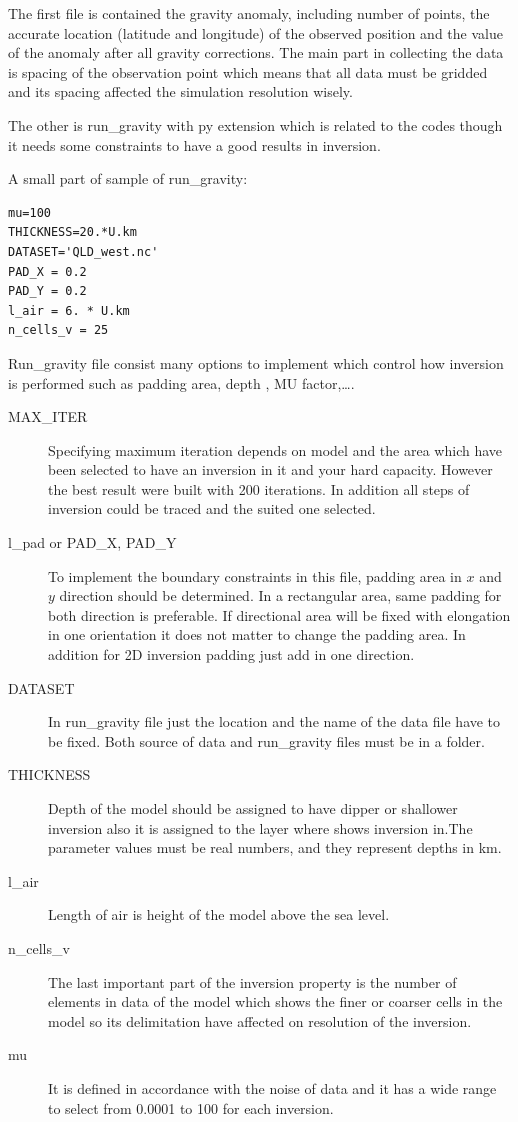The first file is contained the gravity anomaly, including number of points, the accurate location (latitude and longitude) of the observed position and the value of the anomaly after all gravity corrections. The main part in collecting the data is spacing of the observation point which means that all data must be gridded and its spacing affected the simulation resolution wisely.

The other is run_gravity with py extension which is related to the codes though it needs some constraints to have a good results in inversion.

A small part of sample of run_gravity:

\begin{verbatim}
mu=100
THICKNESS=20.*U.km
DATASET='QLD_west.nc'
PAD_X = 0.2
PAD_Y = 0.2
l_air = 6. * U.km
n_cells_v = 25
\end{verbatim}

Run_gravity file consist many options to implement which control how inversion is performed such as padding area, depth , MU factor,\ldots.

\begin{description} 	
\item[MAX\_ITER]
Specifying maximum iteration depends on model and the area which have been selected to have an inversion in it and your hard capacity. However the best result were built with 200 iterations. In addition all steps of inversion could be traced and the suited one selected.

\item[l_pad or PAD\_X, PAD\_Y] To implement the boundary constraints in this file, padding area in $x$ and $y$ direction should be determined. In a rectangular area, same padding for both direction is preferable. If directional area will be fixed with elongation in one orientation it does not matter to change the padding area. In addition for 2D inversion padding just add in one direction.

\item[DATASET] In run_gravity file just the location and the name of the data file have to be fixed. Both source of data and run_gravity files must be in a folder. 

\item[THICKNESS] Depth of the model should be assigned to have dipper or shallower inversion also it is assigned to the layer where shows inversion in.The parameter values must be real numbers, and they represent depths in km.

\item[l_air] Length of air is height of the model above the sea level. 

\item[n_cells_v] The last important part of the inversion property is the number of elements in data of the model which shows the finer or coarser cells in the model so its delimitation have affected on resolution of the inversion.

\item[mu]It is defined in accordance with the noise of data and it has a wide range to select from 0.0001 to 100 for each inversion.

\end{description}


